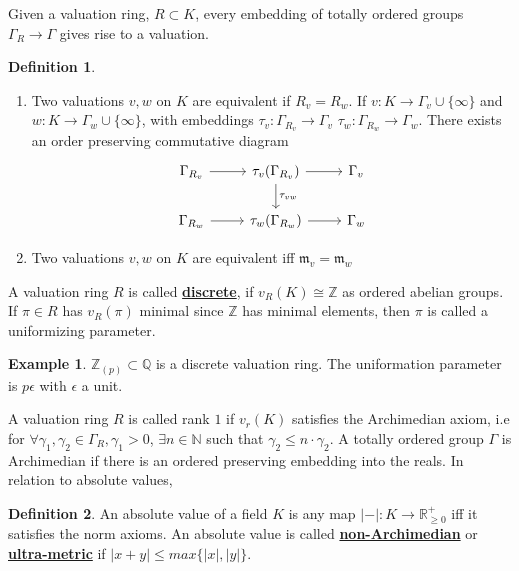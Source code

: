 \documentclass{article}
\theoremstyle{definition}
\theoremstyle{definition}
\theoremstyle{definition}
\theoremstyle{definition}
\theoremstyle{definition}
\newtheorem{definition}{Definition}[section]
\theoremstyle{definition}
\theoremstyle{definition}
\newtheorem{example}{Example}[section]
\begin{document}
Given a valuation ring, $R\subset K$, every embedding of totally ordered groups $\Gamma_R\to \Gamma$ gives rise to a valuation.


\begin{tcolorbox}[colback=purple!5!white,colframe=purple!75!black]
\begin{definition}
\begin{enumerate}
    \item Two valuations $v,w$ on $K$ are equivalent if $R_v=R_w$. If $v: K\to \Gamma_v\cup \{\infty\}$ and $w: K\to \Gamma_w\cup \{\infty\}$, with embeddings $\tau_v: \Gamma_{R_v}\to \Gamma_v$ $\tau_w: \Gamma_{R_w}\to \Gamma_w$. There exists an order preserving commutative diagram
   \[
   \begin{tikzcd}
   \Gamma_{R_v}\arrow[r]&\tau_v(\Gamma_{R_v})\arrow[d,"\tau_{vw}"]\arrow[r]&\Gamma_v\\
   \Gamma_{R_w}\arrow[r]&\tau_w(\Gamma_{R_w})\arrow[r]&\Gamma_w
   \end{tikzcd}\]
   \item  Two valuations $v,w$ on $K$ are equivalent iff $\mathfrak{m}_v=\mathfrak{m}_w$
\end{enumerate}
\end{definition}
\end{tcolorbox}

A valuation ring $R$ is called \underline{\textbf{discrete}}, if $v_R(K)\cong \mathbb{Z}$ as ordered abelian groups. If $\pi\in R$ has $v_R(\pi)$ minimal since $\mathbb{Z}$ has minimal elements, then $\pi$ is called a uniformizing parameter.


\begin{tcolorbox}[colback=yellow!5!white,colframe=yellow!30!white]
\begin{example}
$\mathbb{Z}_{(p)}\subset \mathbb{Q}$ is a discrete valuation ring. The uniformation parameter is $p\epsilon$ with $\epsilon$ a unit. 
\end{example}
\end{tcolorbox}
A valuation ring $R$ is called rank $1$ if $v_r(K)$ satisfies the Archimedian axiom, i.e for $\forall \gamma_1,\gamma_2\in \Gamma_R, \gamma_1>0$, $\exists n\in \mathbb{N}$ such that $\gamma_2\leq n\cdot \gamma_2$. A totally ordered group $\Gamma$ is Archimedian if there is an ordered preserving embedding into the reals. In relation to absolute values,


\begin{tcolorbox}[colback=purple!5!white,colframe=purple!75!black]
\begin{definition}
An absolute value of a field $K$ is any map $|-|: K\to \mathbb{R}_{\geq 0}^+$ iff it satisfies the norm axioms. An absolute value is called \underline{\textbf{non-Archimedian}} or \underline{\textbf{ultra-metric}} if $|x+y|\leq max\{|x|,|y|\}$.
\end{definition}
\end{tcolorbox}
\end{document}
